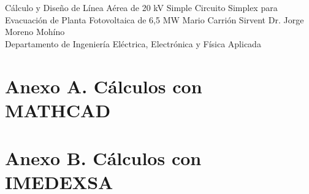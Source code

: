 \documentclass{MUXLaTeX} %
\begin{document}

\maquetacion
{Cálculo y Diseño de Línea Aérea de 20 kV Simple Circuito Simplex para Evacuación de Planta Fotovoltaica de 6,5 MW}          %
{Mario Carrión Sirvent}     %
{Dr. Jorge Moreno Mohíno\\Departamento de Ingeniería Eléctrica, Electrónica y Física Aplicada} %










\bibliografia

\clearpage
\chapter*{Anexo A. Cálculos con MATHCAD}
\label{anexo:mathcad}
  

\clearpage
\chapter*{Anexo B. Cálculos con IMEDEXSA}
\label{anexo:imedexsa}
 
\end{document}
